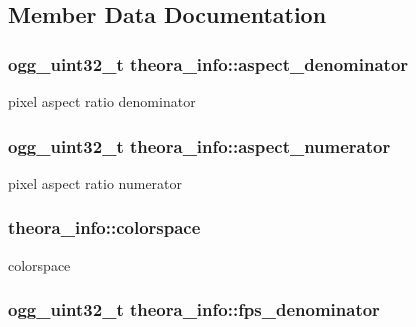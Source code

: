 \subsection{Member Data Documentation}
\hypertarget{structtheora__info_afebc4d0cbfb34b68c833a8c79e83ae12}{
\subsubsection[{aspect\+\_\+denominator}]{\setlength{\rightskip}{0pt plus 5cm}ogg\+\_\+uint32\+\_\+t theora\+\_\+info\+::aspect\+\_\+denominator}}\label{structtheora__info_afebc4d0cbfb34b68c833a8c79e83ae12}
pixel aspect ratio denominator \hypertarget{structtheora__info_a5a3ed8c79815fba1aa06c3f7d8e48b35}{
\subsubsection[{aspect\+\_\+numerator}]{\setlength{\rightskip}{0pt plus 5cm}ogg\+\_\+uint32\+\_\+t theora\+\_\+info\+::aspect\+\_\+numerator}}\label{structtheora__info_a5a3ed8c79815fba1aa06c3f7d8e48b35}
pixel aspect ratio numerator \hypertarget{structtheora__info_a5eaba99c96706d47b426ab7b7602dc5d}{
\subsubsection[{colorspace}]{ theora\+\_\+info\+::colorspace}}\label{structtheora__info_a5eaba99c96706d47b426ab7b7602dc5d}
colorspace \hypertarget{structtheora__info_a9aa7e826e0323a4ae8cd8646a6cfbfea}{
\subsubsection[{fps\+\_\+denominator}]{\setlength{\rightskip}{0pt plus 5cm}ogg\+\_\+uint32\+\_\+t theora\+\_\+info\+::fps\+\_\+denominator}}\label{structtheora__info_a9aa7e826e0323a4ae8cd8646a6cfbfea}
